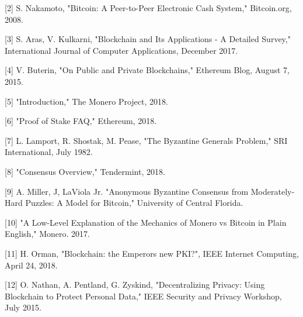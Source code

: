 \documentclass[11pt]{article}
\begin{document}
[2] S. Nakamoto, "Bitcoin: A Peer-to-Peer Electronic Cash System," Bitcoin.org, 2008.

[3] S. Aras, V. Kulkarni, "Blockchain and Its Applications - A Detailed Survey," International Journal of Computer Applications, December 2017.

[4] V. Buterin, "On Public and Private Blockchains," Ethereum Blog, August 7, 2015.

[5] "Introduction," The Monero Project, 2018.

[6] "Proof of Stake FAQ," Ethereum, 2018.

[7] L. Lamport, R. Shostak, M. Pease, "The Byzantine Generals Problem," SRI International, July 1982.

[8] "Consensus Overview," Tendermint, 2018.

[9] A. Miller, J, LaViola Jr. "Anonymous Byzantine Consensus from Moderately-Hard Puzzles: A Model for Bitcoin," University of Central Florida.

[10] "A Low-Level Explanation of the Mechanics of Monero vs Bitcoin in Plain English," Monero. 2017.

[11] H. Orman, "Blockchain: the Emperors new PKI?", IEEE Internet Computing, April 24, 2018.

[12] O. Nathan, A. Pentland, G. Zyskind, "Decentralizing Privacy: Using Blockchain to Protect Personal Data," IEEE Security and Privacy Workshop, July 2015.
\end{document}
